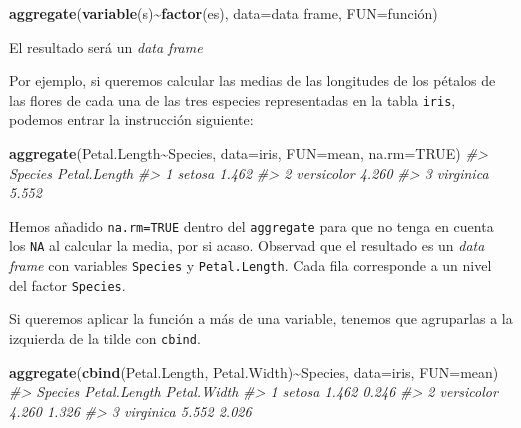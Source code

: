\documentclass[
]{book}
\newenvironment{Shaded}{\begin{snugshade}}{\end{snugshade}}
\newcommand{\CommentTok}[1]{\textcolor[rgb]{0.56,0.35,0.01}{\textit{#1}}}
\newcommand{\DataTypeTok}[1]{\textcolor[rgb]{0.13,0.29,0.53}{#1}}
\newcommand{\KeywordTok}[1]{\textcolor[rgb]{0.13,0.29,0.53}{\textbf{#1}}}
\newcommand{\NormalTok}[1]{#1}
\newcommand{\OperatorTok}[1]{\textcolor[rgb]{0.81,0.36,0.00}{\textbf{#1}}}
\newcommand{\OtherTok}[1]{\textcolor[rgb]{0.56,0.35,0.01}{#1}}
\theoremstyle{definition}
\theoremstyle{definition}
\theoremstyle{definition}
\theoremstyle{remark}
\begin{document}
\begin{Shaded}
\begin{Highlighting}[]
\KeywordTok{aggregate}\NormalTok{(}\KeywordTok{variable}\NormalTok{(s)}\OperatorTok{\textasciitilde{}}\KeywordTok{factor}\NormalTok{(es), }\DataTypeTok{data=}\NormalTok{data frame, }\DataTypeTok{FUN=}\NormalTok{función)}
\end{Highlighting}
\end{Shaded}

El resultado será un \emph{data frame}

Por ejemplo, si queremos calcular las medias de las longitudes de los pétalos de las flores de cada una de las tres especies representadas en la tabla \texttt{iris}, podemos entrar la instrucción siguiente:

\begin{Shaded}
\begin{Highlighting}[]
\KeywordTok{aggregate}\NormalTok{(Petal.Length}\OperatorTok{\textasciitilde{}}\NormalTok{Species, }\DataTypeTok{data=}\NormalTok{iris, }\DataTypeTok{FUN=}\NormalTok{mean, }\DataTypeTok{na.rm=}\OtherTok{TRUE}\NormalTok{)}
\CommentTok{\#\textgreater{}      Species Petal.Length}
\CommentTok{\#\textgreater{} 1     setosa        1.462}
\CommentTok{\#\textgreater{} 2 versicolor        4.260}
\CommentTok{\#\textgreater{} 3  virginica        5.552}
\end{Highlighting}
\end{Shaded}

Hemos añadido \texttt{na.rm=TRUE} dentro del \texttt{aggregate} para que no tenga en cuenta los \texttt{NA} al calcular la media, por si acaso. Observad que el resultado es un \emph{data frame} con variables \texttt{Species} y \texttt{Petal.Length}. Cada fila corresponde a un nivel del factor \texttt{Species}.

Si queremos aplicar la función a más de una variable, tenemos que agruparlas a la izquierda de la tilde con \texttt{cbind}.

\begin{Shaded}
\begin{Highlighting}[]
\KeywordTok{aggregate}\NormalTok{(}\KeywordTok{cbind}\NormalTok{(Petal.Length, Petal.Width)}\OperatorTok{\textasciitilde{}}\NormalTok{Species, }\DataTypeTok{data=}\NormalTok{iris, }\DataTypeTok{FUN=}\NormalTok{mean)}
\CommentTok{\#\textgreater{}      Species Petal.Length Petal.Width}
\CommentTok{\#\textgreater{} 1     setosa        1.462       0.246}
\CommentTok{\#\textgreater{} 2 versicolor        4.260       1.326}
\CommentTok{\#\textgreater{} 3  virginica        5.552       2.026}
\end{Highlighting}
\end{Shaded}
\end{document}

